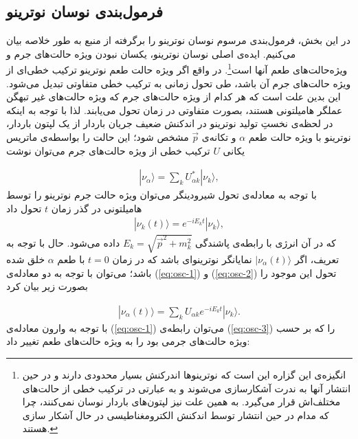 \documentclass[a4paper]{book}
\begin{document}
\subsection{فرمول‌بندی نوسان نوترینو}
در این بخش، فرمول‌بندی مرسوم نوسان نوترینو را برگرفته از منبع \cite{Giunti:2007ry} به طور خلاصه بیان می‌کنیم.
ایده‌ی اصلی نوسان نوترینو، یکسان نبودن ویژه حالت‌های جرم و ویژه‌حالت‌های طعم آنها است\footnote{انگیزه‌ی این گزاره این است که نوترینوها اندرکنش بسیار محدودی دارند و در حین انتشار آنها به ندرت آشکارسازی می‌شوند و به عبارتی در ترکیب خطی از حالت‌های مختلف‌اش قرار می‌گیرد. به همین علت نیز لپتون‌های باردار نوسان نمی‌کنند، چرا که مدام در حین انتشار توسط اندکنش الکترومغناطیسی در حال آشکار سازی هستند.}. در واقع اگر ویژه حالت طعم نوترینو ترکیب خطی‌ای از ویژه حالت‌های جرم آن باشد، طی تحول زمانی به ترکیب خطی متفاوتی تبدیل می‌شود. این بدین علت است که هر کدام از ویژه حالت‌های جرم که ویژه حالت‌های غیر تبهگن عملگر هامیلتونی هستند، بصورت متفاوتی در زمان تحول می‌یابند.
لذا با توجه به اینکه در لحظه‌ی نخستِ تولید نوترینو در اندکنش ضعیف جریان باردار از یک لپتون باردار، نوترینو با ویژه حالت طعم {\footnotesize$\alpha$} و تکانه‌ی {\footnotesize$\vec{p}$} مشخص شود؛ این حالت را بواسطه‌ی ماتریس یکانی {\footnotesize$U$} ترکیب خطی از ویژه حالت‌های جرم می‌توان نوشت
\par
\vspace{-0.5cm}
{\footnotesize\begin{align}
	|\nu_\alpha\rangle = \sum_{k} U^*_{\alpha k} |\nu_k\rangle,
	\label{eq:osc-1}
\end{align}}
با توجه به معادله‌ی تحول شیرودینگر می‌توان ویژه حالت جرم نوترینو را توسط هامیلتونی در گذر زمان {\footnotesize$t$} تحول داد
{\footnotesize\begin{align}
	|\nu_k(t)\rangle = e^{-iE_kt} |\nu_k\rangle,
	\label{eq:osc-2}
\end{align}}
که در آن انرژی با رابطه‌ی پاشندگی {\footnotesize$E_k = \sqrt{\vec{p}^2 + m_k^2}$} داده می‌شود.
حال با توجه به تعریف، اگر {\footnotesize$|\nu_{\alpha}(t)\rangle$} نمایانگر نوترینوای باشد که در زمان {\footnotesize$t=0$} با طعم {\footnotesize$\alpha$} خلق شده باشد؛ می‌توان با توجه به دو معادله‌ی (\ref{eq:osc-1}) و (\ref{eq:osc-2}) تحول این موجود را بصورت زیر بیان کرد
\par
\vspace{-0.5cm}
{\footnotesize\begin{align}
	|\nu_\alpha (t)\rangle = \sum_{k} U_{\alpha k} e^{-iE_k t} |\nu_k\rangle.
	\label{eq:osc-3}
\end{align}}
با توجه به وارون معادله‌ی (\ref{eq:osc-1}) می‌توان رابطه‌ی (\ref{eq:osc-3}) را که بر حسب ویژه حالت‌های جرمی بود را به ویژه حالت‌های طعم تغییر داد:
\end{document}
